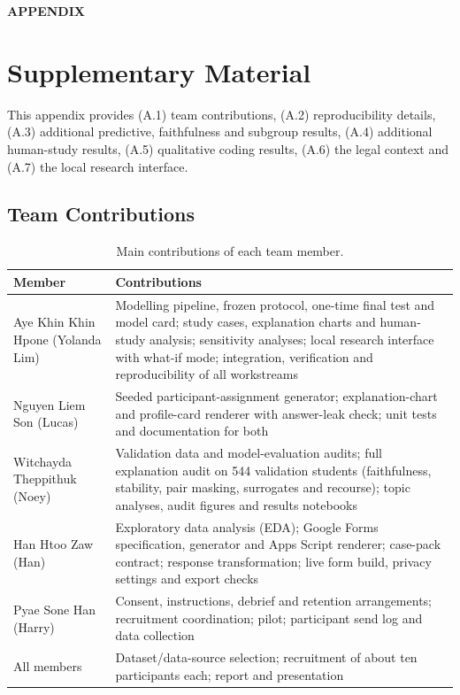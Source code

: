 \FloatBarrier
\clearpage
\onecolumn
\appendix

\begin{center}
{\Large \textbf{APPENDIX}}
\end{center}

\section{Supplementary Material}
\label{sec:appendix}

This appendix provides (A.1) team contributions, (A.2) reproducibility details, (A.3) additional
predictive, faithfulness and subgroup results, (A.4) additional human-study results, (A.5) qualitative
coding results, (A.6) the legal context and (A.7) the local research interface.

\subsection{Team Contributions}
\label{sec:app-contrib}

\begin{table}[H]
\centering
\caption{Main contributions of each team member.}
\label{tab:contributions}
\footnotesize
\begin{tabular}{@{}p{4.6cm}p{11.0cm}@{}}
\toprule
\textbf{Member} & \textbf{Contributions} \\
\midrule
Aye Khin Khin Hpone (Yolanda Lim) & Modelling pipeline, frozen protocol, one-time final test and model card; study cases, explanation charts and human-study analysis; sensitivity analyses; local research interface with what-if mode; integration, verification and reproducibility of all workstreams \\
Nguyen Liem Son (Lucas) & Seeded participant-assignment generator; explanation-chart and profile-card renderer with answer-leak check; unit tests and documentation for both \\
Witchayda Theppithuk (Noey) & Validation data and model-evaluation audits; full explanation audit on 544 validation students (faithfulness, stability, pair masking, surrogates and recourse); topic analyses, audit figures and results notebooks \\
Han Htoo Zaw (Han) & Exploratory data analysis (EDA); Google Forms specification, generator and Apps Script renderer; case-pack contract; response transformation; live form build, privacy settings and export checks \\
Pyae Sone Han (Harry) & Consent, instructions, debrief and retention arrangements; recruitment coordination; pilot; participant send log and data collection \\
\midrule
All members & Dataset/data-source selection; recruitment of about ten participants each; report and presentation \\
\bottomrule
\end{tabular}
\end{table}

